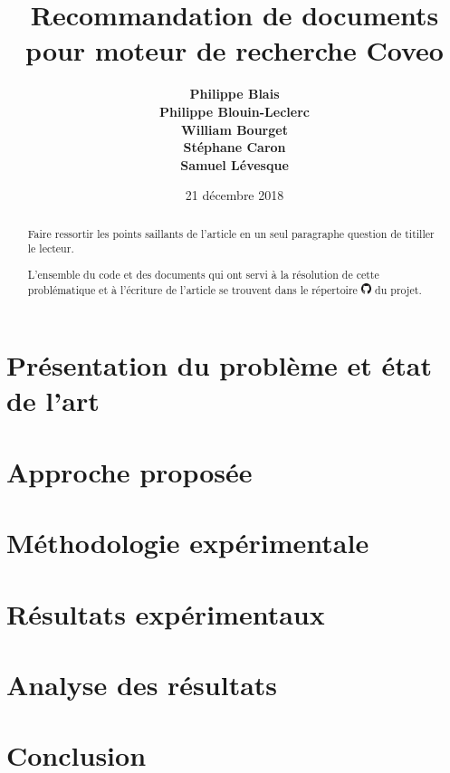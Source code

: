\documentclass[10pt,letterpaper]{article}
\title{Recommandation de documents pour moteur de recherche Coveo}
\author{{\large \bf Philippe Blais} \\
   {\large \bf Philippe Blouin-Leclerc} \\
   {\large \bf William Bourget} \\
   {\large \bf Stéphane Caron} \\
   {\large \bf Samuel Lévesque}}
\date{21 décembre 2018}
\numberwithin{equation}{section}
\begin{document}
\maketitle

\begin{multicols}{2}

\begin{abstract}
Faire ressortir les points saillants de l'article en un seul paragraphe question de titiller le lecteur. 

L'ensemble du code et des documents qui ont servi à la résolution de cette problématique et à l'écriture de l'article se trouvent dans le répertoire \href{https://github.com/stecaron/projet-gif-7005}{\includegraphics[height=0.3cm]{GitHub-Mark-32px}} du projet.
\end{abstract}


\section{Présentation du problème et état de l'art}




\section{Approche proposée}




\section{Méthodologie expérimentale}




\section{Résultats expérimentaux}




\section{Analyse des résultats}




\section{Conclusion}



\nocite{Alpaydin:2010:IML:1734076}
\nocite{Deep_rank}
\nocite{Goodfellow-et-al-2016}
\nocite{hastie01statisticallearning}
\nocite{list_wise_ranking}



\setlength{\bibleftmargin}{.125in}
\setlength{\bibindent}{-\bibleftmargin}



\end{multicols}
\end{document}
